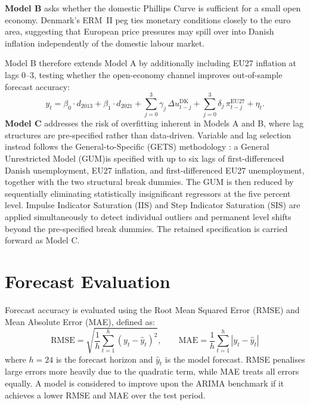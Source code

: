 \textbf{Model B} asks whether the domestic Phillips Curve is sufficient for a small open economy. Denmark's ERM~II peg ties monetary conditions closely to the euro area, suggesting that European price pressures may spill over into Danish inflation independently of the domestic labour market. 

Model B therefore extends Model A by additionally including EU27 inflation at lags 0--3, testing whether the open-economy channel improves out-of-sample forecast accuracy:
\[
y_t = \beta_0 \cdot d_{2013} + \beta_1 \cdot d_{2021} +
\sum_{j=0}^{3} \gamma_j\,\Delta u^{\text{DK}}_{t-j} +
\sum_{j=0}^{3} \delta_j\,\pi^{\text{EU27}}_{t-j} + \eta_t.
\]
\textbf{Model C} addresses the risk of overfitting inherent in Models A and B, where lag structures are pre-specified rather than data-driven. Variable and lag selection instead follows the General-to-Specific (GETS) methodology \parencite{doornik2014}: a General Unrestricted Model (GUM)is specified with up to six lags of first-differenced Danish unemployment, EU27 inflation, and first-differenced EU27 unemployment, together with the two structural break dummies. The GUM is then reduced by sequentially eliminating statistically insignificant regressors at the five percent level. Impulse Indicator Saturation (IIS) and Step Indicator Saturation (SIS) are applied simultaneously to detect individual outliers and permanent level shifts beyond the pre-specified break dummies. The retained specification is carried forward as Model C. 





\section{Forecast Evaluation}

Forecast accuracy is evaluated using the Root Mean Squared Error (RMSE) and Mean Absolute Error (MAE), defined as:
\[
\text{RMSE} = \sqrt{\frac{1}{h}\sum_{t=1}^{h}(y_t - \hat{y}_t)^2}, \qquad
\text{MAE}  = \frac{1}{h}\sum_{t=1}^{h}|y_t - \hat{y}_t|
\]
where $h = 24$ is the forecast horizon and $\hat{y}_t$ is the model forecast. RMSE penalises large errors more heavily due to the quadratic term, while MAE treats all errors equally. A model is considered to improve upon the ARIMA benchmark if it achieves a lower RMSE and MAE over the test period.